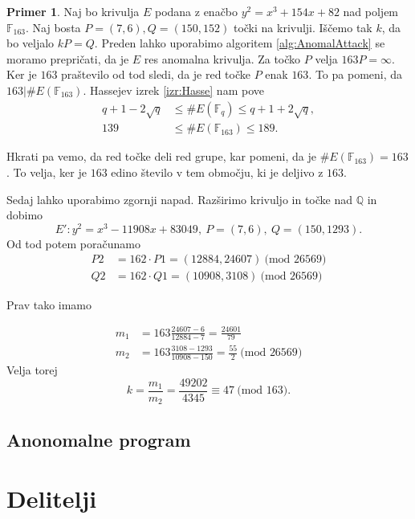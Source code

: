 \documentclass[12pt,a4paper,twoside]{article}
\theoremstyle{definition} %
\newtheorem{primer}[definicija]{Primer}
\theoremstyle{plain} %
\numberwithin{equation}{section}  %
\newcommand{\Q}{\mathbb Q}
\newcommand{\F}{\mathbb F}
\newcommand{\E}[1]{E({#1})}
\newcommand{\MOD}[1]{\ \text{(mod }{#1}\text{)}}
\begin{document}
\begin{primer}

Naj bo krivulja $E$ podana z enačbo $y^2=x^3+154x+82$ nad poljem $\F_{163}$. Naj bosta $P = (7,6),Q = (150,152)$ točki na krivulji. Iščemo tak $k$, da bo veljalo $kP=Q$. Preden lahko uporabimo algoritem \ref{alg:AnomalAttack} se moramo prepričati, da je $E$ res anomalna krivulja. Za točko $P$ velja $163P = \infty$. Ker je $163$ praštevilo od tod sledi, da je red točke $P$ enak $163$. To pa pomeni, da $163|\#\E{\F_{163}}$. Hassejev izrek \ref{izr:Hasse} nam pove 
\begin{align}
q+1-2\sqrt{q} &{}\leq \#\E{\F_q} \leq q+1+2\sqrt{q}, \nonumber \\
139 &{}\leq \#\E{\F_{163}} \leq 189. \nonumber
\end{align}

Hkrati pa vemo, da red točke deli red grupe, kar pomeni, da je $\#\E{\F_{163}} = 163$. To velja, ker je $163$ edino število v tem območju, ki je deljivo z $163$.

Sedaj lahko uporabimo zgornji napad. Razširimo krivuljo in točke nad $\Q$ in dobimo
$$E': y^2 = x^3-11908x+83049, \ P =(7,6), \ Q=(150,1293).$$
Od tod potem poračunamo
\begin{align}
P2 &{}= 162\cdot P1 = (12884,24607) \MOD{26569} \nonumber \\
Q2 &{}= 162\cdot Q1 = (10908,3108) \MOD{26569} \nonumber
\end{align}

Prav tako imamo

\begin{align}
m_1 &{}= 163\frac{24607-6}{12884-7} = \frac{24601}{79} \nonumber \\
m_2 &{}= 163\frac{3108-1293}{10908-150} = \frac{55}{2} \MOD{26569} \nonumber
\end{align}
 Velja torej
$$k = \frac{m_1}{m_2} = \frac{49202}{4345} \equiv 47 \MOD{163}.$$
\end{primer}

\subsection{Anonomalne program}


\section{Delitelji}
\end{document}
